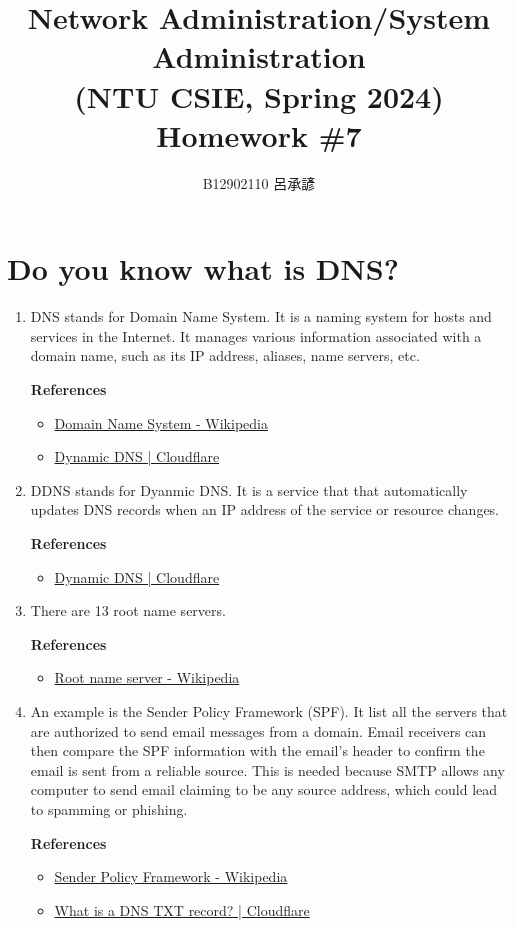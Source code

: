 \documentclass[12pt, a4paper]{article}
\title{
  \vspace{-1cm}
  Network Administration/System Administration\\
  (NTU CSIE, Spring 2024)\\
  Homework \#7
}
\author{\Large B12902110 呂承諺}
\begin{document}
  \maketitle

  \section{Do you know what is DNS?}
  \begin{enumerate}
    \item DNS stands for Domain Name System. It is a naming system for
    hosts and services in the Internet. It manages various information
    associated with a domain name, such as its IP address, aliases, name servers, etc.

    \textbf{References}
    \begin{itemize}
      \item \href{https://en.wikipedia.org/wiki/Domain_Name_System}{Domain Name System - Wikipedia}
      \item \href{https://www.cloudflare.com/learning/dns/what-is-dns/}{Dynamic DNS | Cloudflare}
    \end{itemize}

    \item DDNS stands for Dyanmic DNS. It is a service that that automatically
    updates DNS records when an IP address of the service or resource changes.

    \textbf{References}
    \begin{itemize}
      \item \href{https://www.cloudflare.com/learning/dns/glossary/dynamic-dns/}{Dynamic DNS | Cloudflare}
    \end{itemize}

    \item There are 13 root name servers.

    \textbf{References}
    \begin{itemize}
      \item \href{https://en.wikipedia.org/wiki/Root_name_server}{Root name server - Wikipedia}
    \end{itemize}

    \item An example is the Sender Policy Framework (SPF). It list all the servers
    that are authorized to send email messages from a domain. Email receivers can then
    compare the SPF information with the email's header to confirm the email is sent
    from a reliable source. This is needed because SMTP allows any computer to send
    email claiming to be any source address, which could lead to spamming or phishing.

    \textbf{References}
    \begin{itemize}
      \item \href{https://en.wikipedia.org/wiki/Sender_Policy_Framework}{Sender Policy Framework - Wikipedia}
      \item \href{https://www.cloudflare.com/learning/dns/dns-records/dns-txt-record/}{What is a DNS TXT record? | Cloudflare}
    \end{itemize}
  \end{enumerate}
\end{document}
